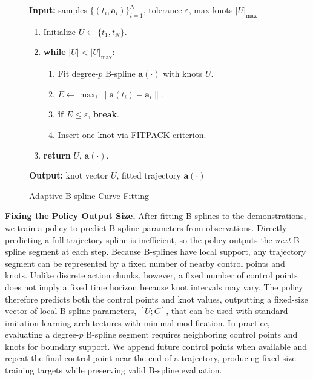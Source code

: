 \begin{figure}
\vspace{-20pt}
\centering
\begin{minipage}{0.55\textwidth}
\begin{algorithm}[H]
\caption{Adaptive B-spline Curve Fitting}
\label{alg:spline-compress}
\small
\textbf{Input:} samples $\{(t_i, \mathbf{a}_i)\}_{i=1}^N$, tolerance $\varepsilon$, max knots $|U|_{\max}$ 
\begin{enumerate}[leftmargin=1.2em,itemsep=0pt,topsep=2pt]
\item Initialize $U \gets \{t_1, t_N\}$.
\item \textbf{while} $|U| < |U|_{\max}$:
  \begin{enumerate}[leftmargin=1.2em,itemsep=0pt,topsep=0pt]
  \item Fit degree-$p$ B-spline $\mathbf{a}(\cdot)$ with knots $U$.
  \item $E \gets \max_i \|\mathbf{a}(t_i) - \mathbf{a}_i\|$.
  \item \textbf{if} $E \le \varepsilon$, \textbf{break}.
  \item Insert one knot via FITPACK criterion.
  \end{enumerate}
\item \textbf{return} $U$, $\mathbf{a}(\cdot)$.
\end{enumerate}
\textbf{Output:} knot vector $U$, fitted trajectory $\mathbf{a}(\cdot)$

\end{algorithm}
\end{minipage}
\vspace{-1em}
\end{figure}


\noindent\textbf{Fixing the Policy Output Size.} After fitting B-splines to the demonstrations, we train a policy to predict B-spline parameters from observations. Directly predicting a full-trajectory spline is inefficient, so the policy outputs the \emph{next} B-spline segment at each step.
\newline
Because B-splines have local support, any trajectory segment can be represented by a fixed number of nearby control points and knots. Unlike discrete action chunks, however, a fixed number of control points does not imply a fixed time horizon because knot intervals may vary. The policy therefore predicts both the control points and knot values, outputting a fixed-size vector of local B-spline parameters, $[U; C]$, that can be used with standard imitation learning architectures with minimal modification.
\newline
In practice, evaluating a degree-$p$ B-spline segment requires neighboring control points and knots for boundary support. We append future control points when available and repeat the final control point near the end of a trajectory, producing fixed-size training targets while preserving valid B-spline evaluation.

